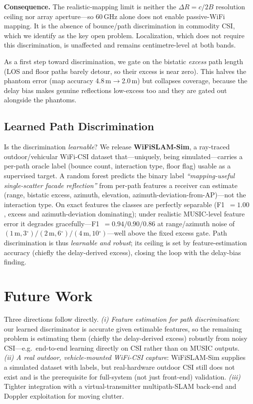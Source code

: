 \documentclass[journal]{IEEEtran}
\newcommand{\SI}[2]{#1\,#2}
\providecommand{\degree}{\ensuremath{^\circ}}
\begin{document}
\textbf{Consequence.} The realistic-mapping limit is neither the $\Delta R=c/2B$
resolution ceiling nor array aperture---so \SI{60}{GHz} alone does not enable
passive-WiFi mapping. It is the absence of bounce/path discrimination in commodity
CSI, which we identify as the key open problem. Localization, which does not require
this discrimination, is unaffected and remains centimetre-level at both bands.

As a first step toward discrimination, we gate on the bistatic \emph{excess} path
length (LOS and floor paths barely detour, so their excess is near zero). This
halves the phantom error (map accuracy \SI{4.8}{m}$\to$\SI{2.0}{m}) but collapses
coverage, because the delay bias makes genuine reflections low-excess too and they
are gated out alongside the phantoms.

\subsection{Learned Path Discrimination}
Is the discrimination \emph{learnable}? We release \textbf{WiFiSLAM-Sim}, a ray-traced
outdoor/vehicular WiFi-CSI dataset that---uniquely, being simulated---carries a
per-path oracle label (bounce count, interaction type, floor flag) usable as a
supervised target. A random forest predicts the binary label \emph{``mapping-useful
single-scatter facade reflection''} from per-path features a receiver can estimate
(range, bistatic excess, azimuth, elevation, azimuth-deviation-from-AP)---not the
interaction type. On exact features the classes are perfectly separable (F1~$=1.00$,
excess and azimuth-deviation dominating); under realistic MUSIC-level feature error
it degrades gracefully---F1~$=0.94/0.90/0.86$ at range/azimuth noise of
$(1\,\text{m},3\degree)/(2\,\text{m},6\degree)/(4\,\text{m},10\degree)$---well above
the fixed excess gate. Path discrimination is thus \emph{learnable and robust}; its
ceiling is set by feature-estimation accuracy (chiefly the delay-derived excess),
closing the loop with the delay-bias finding.

\section{Future Work}
Three directions follow directly. \emph{(i) Feature estimation for path
discrimination}: our learned discriminator is accurate given estimable features, so
the remaining problem is estimating them (chiefly the delay-derived excess) robustly
from noisy CSI---e.g.\ end-to-end learning directly on CSI rather than on MUSIC
outputs. \emph{(ii) A real outdoor, vehicle-mounted WiFi-CSI capture}: WiFiSLAM-Sim
supplies a simulated dataset with labels, but real-hardware outdoor CSI still does
not exist and is the prerequisite for full-system (not just front-end) validation.
\emph{(iii)} Tighter integration with a
virtual-transmitter multipath-SLAM back-end
\cite{gentner2016channelslam,leitinger2024mpslamcoop} and Doppler exploitation for
moving clutter.
\end{document}
